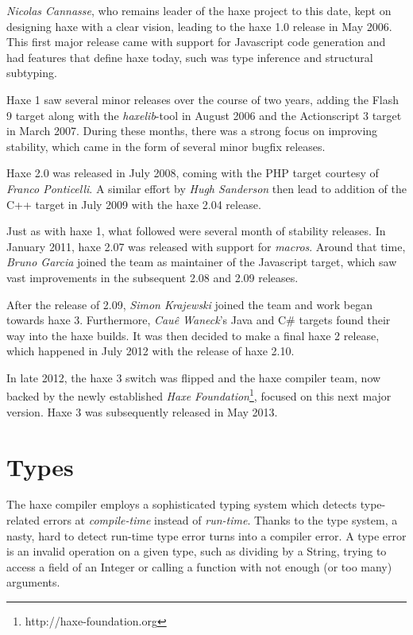 \documentclass{article}
\newcommand{\target}[1]{#1}
\begin{document}
\emph{Nicolas Cannasse}, who remains leader of the haxe project to this date, kept on designing haxe with a clear vision, leading to the haxe 1.0 release in May 2006. This first major release came with support for \target{Javascript} code generation and had features that define haxe today, such was type inference and structural subtyping.

Haxe 1 saw several minor releases over the course of two years, adding the \target{Flash 9} target along with the \emph{haxelib}-tool in August 2006 and the \target{Actionscript 3} target in March 2007. During these months, there was a strong focus on improving stability, which came in the form of several minor bugfix releases.

Haxe 2.0 was released in July 2008, coming with the \target{PHP} target courtesy of \emph{Franco Ponticelli}. A similar effort by \emph{Hugh Sanderson} then lead to addition of the \target{C++} target in July 2009 with the haxe 2.04 release.

Just as with haxe 1, what followed were several month of stability releases. In January 2011, haxe 2.07 was released with support for \emph{macros}. Around that time, \emph{Bruno Garcia} joined the team as maintainer of the \target{Javascript} target, which saw vast improvements in the subsequent 2.08 and 2.09 releases.

After the release of 2.09, \emph{Simon Krajewski} joined the team and work began towards haxe 3. Furthermore, \emph{Cau\^{e} Waneck}'s \target{Java} and \target{C\#} targets found their way into the haxe builds. It was then decided to make a final haxe 2 release, which happened in July 2012 with the release of haxe 2.10.

In late 2012, the haxe 3 switch was flipped and the haxe compiler team, now backed by the newly established \emph{Haxe Foundation}\footnote{http://haxe-foundation.org}, focused on this next major version. Haxe 3 was subsequently released in May 2013.

\section{Types}
\label{Types}

The haxe compiler employs a sophisticated typing system which detects type-related errors at \emph{compile-time} instead of \emph{run-time}.  Thanks to the type system, a nasty, hard to detect run-time type error turns into a compiler error.  A type error is an invalid operation on a given type, such as dividing by a String, trying to access a field of an Integer or calling a function with not enough (or too many) arguments.
\end{document}
